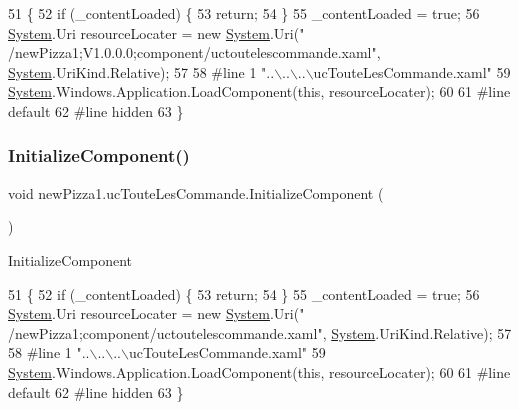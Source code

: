 \begin{DoxyCode}
51                                           \{
52             \textcolor{keywordflow}{if} (\_contentLoaded) \{
53                 \textcolor{keywordflow}{return};
54             \}
55             \_contentLoaded = \textcolor{keyword}{true};
56             \hyperlink{namespaceSystem}{System}.Uri resourceLocater = \textcolor{keyword}{new} \hyperlink{namespaceSystem}{System}.Uri(\textcolor{stringliteral}{"
      /newPizza1;V1.0.0.0;component/uctoutelescommande.xaml"}, \hyperlink{namespaceSystem}{System}.UriKind.Relative);
57             
58 \textcolor{preprocessor}{            #line 1 "..\(\backslash\)..\(\backslash\)..\(\backslash\)ucTouteLesCommande.xaml"}
59             \hyperlink{namespaceSystem}{System}.Windows.Application.LoadComponent(\textcolor{keyword}{this}, resourceLocater);
60             
61 \textcolor{preprocessor}{            #line default}
62 \textcolor{preprocessor}{            #line hidden}
63         \}
\end{DoxyCode}
\mbox{\label{classnewPizza1_1_1ucTouteLesCommande_a8349ab5709ac09dd8c7e3f8d2cc0b633}} 
\subsubsection{\texorpdfstring{Initialize\+Component()}{InitializeComponent()}\hspace{0.1cm}{\footnotesize\ttfamily [6/6]}}
{\footnotesize\ttfamily void new\+Pizza1.\+uc\+Toute\+Les\+Commande.\+Initialize\+Component (\begin{DoxyParamCaption}{ }\end{DoxyParamCaption})\hspace{0.3cm}{\ttfamily [inline]}}



Initialize\+Component 


\begin{DoxyCode}
51                                           \{
52             \textcolor{keywordflow}{if} (\_contentLoaded) \{
53                 \textcolor{keywordflow}{return};
54             \}
55             \_contentLoaded = \textcolor{keyword}{true};
56             \hyperlink{namespaceSystem}{System}.Uri resourceLocater = \textcolor{keyword}{new} \hyperlink{namespaceSystem}{System}.Uri(\textcolor{stringliteral}{"
      /newPizza1;component/uctoutelescommande.xaml"}, \hyperlink{namespaceSystem}{System}.UriKind.Relative);
57             
58 \textcolor{preprocessor}{            #line 1 "..\(\backslash\)..\(\backslash\)..\(\backslash\)ucTouteLesCommande.xaml"}
59             \hyperlink{namespaceSystem}{System}.Windows.Application.LoadComponent(\textcolor{keyword}{this}, resourceLocater);
60             
61 \textcolor{preprocessor}{            #line default}
62 \textcolor{preprocessor}{            #line hidden}
63         \}
\end{DoxyCode}



